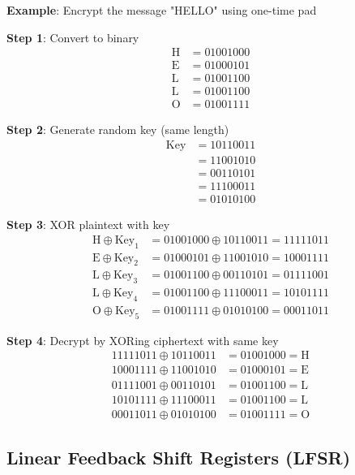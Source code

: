\documentclass[11pt,a4paper]{article}
\begin{document}
\begin{examplebox}
\textbf{Example}: Encrypt the message "HELLO" using one-time pad

\textbf{Step 1}: Convert to binary
\begin{align*}
\text{H} &= 01001000 \\
\text{E} &= 01000101 \\
\text{L} &= 01001100 \\
\text{L} &= 01001100 \\
\text{O} &= 01001111
\end{align*}

\textbf{Step 2}: Generate random key (same length)
\begin{align*}
\text{Key} &= 10110011 \\
&= 11001010 \\
&= 00110101 \\
&= 11100011 \\
&= 01010100
\end{align*}

\textbf{Step 3}: XOR plaintext with key
\begin{align*}
\text{H} \oplus \text{Key}_1 &= 01001000 \oplus 10110011 = 11111011 \\
\text{E} \oplus \text{Key}_2 &= 01000101 \oplus 11001010 = 10001111 \\
\text{L} \oplus \text{Key}_3 &= 01001100 \oplus 00110101 = 01111001 \\
\text{L} \oplus \text{Key}_4 &= 01001100 \oplus 11100011 = 10101111 \\
\text{O} \oplus \text{Key}_5 &= 01001111 \oplus 01010100 = 00011011
\end{align*}

\textbf{Step 4}: Decrypt by XORing ciphertext with same key
\begin{align*}
11111011 \oplus 10110011 &= 01001000 = \text{H} \\
10001111 \oplus 11001010 &= 01000101 = \text{E} \\
01111001 \oplus 00110101 &= 01001100 = \text{L} \\
10101111 \oplus 11100011 &= 01001100 = \text{L} \\
00011011 \oplus 01010100 &= 01001111 = \text{O}
\end{align*}
\end{examplebox}

\subsection{Linear Feedback Shift Registers (LFSR)}
\end{document}
